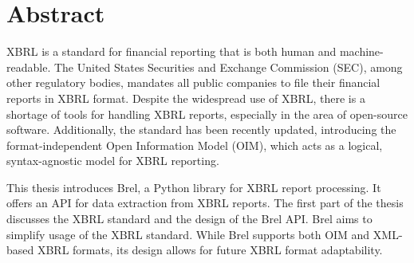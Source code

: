 \section{Abstract}




XBRL is a standard for financial reporting that is both human and machine-readable\cite{xbrl}.
The United States Securities and Exchange Commission (SEC)\cite{sec_ixbrl}, among other regulatory bodies,  
mandates all public companies to file their financial reports in XBRL format.
Despite the widespread use of XBRL, there is a shortage of tools for handling XBRL reports,
especially in the area of open-source software.
Additionally, the standard has been recently updated,  
introducing the format-independent Open Information Model (OIM)\cite{oim}, 
which acts as a logical, syntax-agnostic model for XBRL reporting.

This thesis introduces Brel, a Python library for XBRL report processing.  
It offers an API for data extraction from XBRL reports.
The first part of the thesis discusses the XBRL standard and the design of the Brel API.
Brel aims to simplify usage of the XBRL standard.
While Brel supports both OIM and XML-based XBRL formats,  
its design allows for future XBRL format adaptability.

